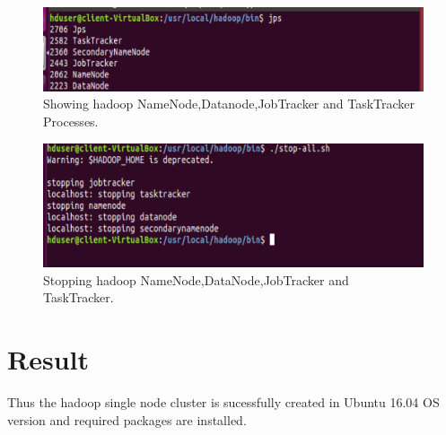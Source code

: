 \documentclass[a4paper,10pt]{article}
\begin{document}
\begin{figure}[h]
	\includegraphics[scale=0.55,center]{exptFourScreenShot/fig12.png}
	\caption{Showing hadoop NameNode,Datanode,JobTracker and TaskTracker Processes.}
	\label{fig:12}
\end{figure}

\newpage
\begin{figure}[h]
	\includegraphics[scale=0.40,center]{exptFourScreenShot/fig13.png}
	\caption{Stopping hadoop NameNode,DataNode,JobTracker and TaskTracker.}
\end{figure}


\section{Result}
Thus the hadoop single node cluster is sucessfully created in Ubuntu 16.04 OS version and required packages are installed.
\end{document}
